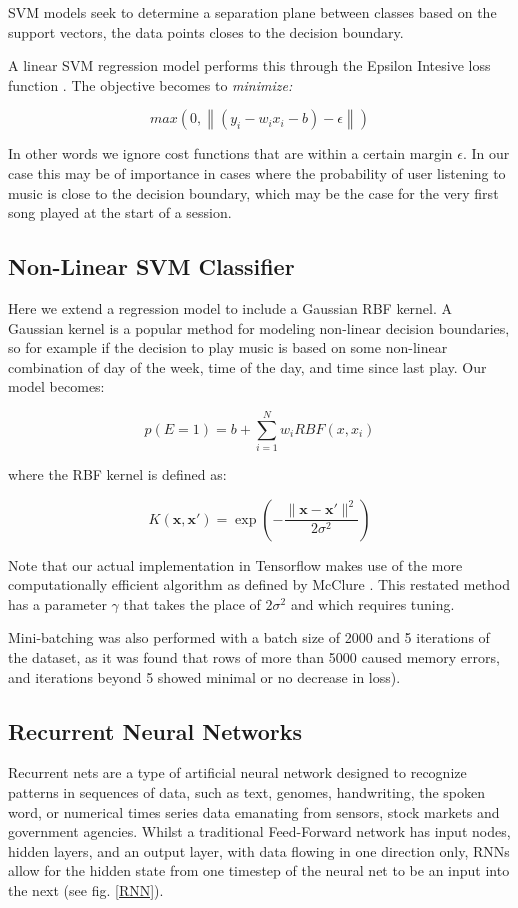 SVM models seek to determine a separation plane between classes based on the support vectors, the data points closes to the decision boundary.

A linear SVM regression model performs this through the Epsilon Intesive loss function \parencite{Vapnik}. The objective becomes to \textit{minimize:}

$$max(0,\left\| (y_i - w_i x_i - b) - \epsilon \right\|)$$

In other words we ignore cost functions that are within a certain margin  $\epsilon$. In our case this may be of importance in cases where the probability of user listening to music is close to the decision boundary, which may be the case for the very first song played at the start of a session.

\subsection{Non-Linear SVM Classifier}

Here we extend a regression model to include a Gaussian RBF kernel. A Gaussian kernel is a popular method for modeling non-linear decision boundaries, so for example if the decision to play music is based on some non-linear combination of day of the week, time of the day, and time since last play. Our model becomes:

$$p(E=1)=b+\sum^N_{i=1}w_iRBF(x,x_i)$$

where the RBF kernel is defined as:

$$K(\mathbf {x} ,\mathbf {x'} )=\exp \left(-{\frac {\|\mathbf {x} -\mathbf {x'} \|^{2}}{2\sigma ^{2}}}\right)$$

Note that our actual implementation in Tensorflow makes use of the more computationally efficient algorithm as defined by McClure \parencite{TFCookbook}. This restated method has a parameter $\gamma$ that takes the place of $2\sigma^2$ and which requires tuning.

Mini-batching was also performed with a batch size of 2000 and 5 iterations of the dataset, as it was found that rows of more than 5000 caused memory errors, and iterations beyond 5 showed minimal or no decrease in loss).

\subsection{Recurrent Neural Networks}

Recurrent nets are a type of artificial neural network designed to recognize patterns in sequences of data, such as text, genomes, handwriting, the spoken word, or numerical times series data emanating from sensors, stock markets and government agencies. Whilst a traditional Feed-Forward network \parencite{MLP} has input nodes, hidden layers, and an output layer, with data flowing in one direction only, RNNs allow for the hidden state from one timestep of the neural net to be an input into the next (see fig. \ref{RNN}).

